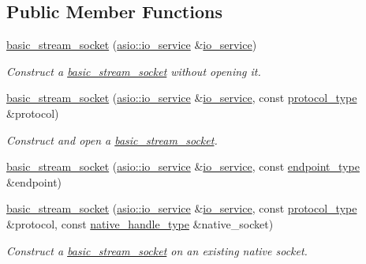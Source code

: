 \subsection*{Public Member Functions}
\begin{DoxyCompactItemize}
\item 
\hyperlink{classasio_1_1basic__stream__socket_a3b4a4a7fd4ae067886af89f685282a6c}{basic\+\_\+stream\+\_\+socket} (\hyperlink{classasio_1_1io__service}{asio\+::io\+\_\+service} \&\hyperlink{classasio_1_1io__service}{io\+\_\+service})
\begin{DoxyCompactList}\small\item\em Construct a \hyperlink{classasio_1_1basic__stream__socket}{basic\+\_\+stream\+\_\+socket} without opening it. \end{DoxyCompactList}\item 
\hyperlink{classasio_1_1basic__stream__socket_a6ded436ad179fa1204b8a6a42524f693}{basic\+\_\+stream\+\_\+socket} (\hyperlink{classasio_1_1io__service}{asio\+::io\+\_\+service} \&\hyperlink{classasio_1_1io__service}{io\+\_\+service}, const \hyperlink{classasio_1_1basic__stream__socket_a50b36dfd32d1cca507415b41ab7274d9}{protocol\+\_\+type} \&protocol)
\begin{DoxyCompactList}\small\item\em Construct and open a \hyperlink{classasio_1_1basic__stream__socket}{basic\+\_\+stream\+\_\+socket}. \end{DoxyCompactList}\item 
\hyperlink{classasio_1_1basic__stream__socket_a099d36894656e54d71f926e73f4f0a63}{basic\+\_\+stream\+\_\+socket} (\hyperlink{classasio_1_1io__service}{asio\+::io\+\_\+service} \&\hyperlink{classasio_1_1io__service}{io\+\_\+service}, const \hyperlink{classasio_1_1basic__stream__socket_a910d3f9ffa82f284f3fccbecb2f2d3fb}{endpoint\+\_\+type} \&endpoint)
\item 
\hyperlink{classasio_1_1basic__stream__socket_a90200909391b8547d41e64fea860a019}{basic\+\_\+stream\+\_\+socket} (\hyperlink{classasio_1_1io__service}{asio\+::io\+\_\+service} \&\hyperlink{classasio_1_1io__service}{io\+\_\+service}, const \hyperlink{classasio_1_1basic__stream__socket_a50b36dfd32d1cca507415b41ab7274d9}{protocol\+\_\+type} \&protocol, const \hyperlink{classasio_1_1basic__stream__socket_a3afcab378b90959f1779a74b25e4ad1e}{native\+\_\+handle\+\_\+type} \&native\+\_\+socket)
\begin{DoxyCompactList}\small\item\em Construct a \hyperlink{classasio_1_1basic__stream__socket}{basic\+\_\+stream\+\_\+socket} on an existing native socket. \end{DoxyCompactList}\item 

\end{DoxyCompactItemize}
